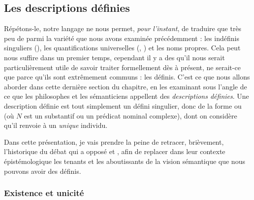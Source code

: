 \medskip











\subsection{Les descriptions définies}  %
\label{s:GNdef}


Répétons-le, notre langage {\LO} ne nous permet, \emph{pour l'instant}, de traduire que très peu de {\GN} parmi la variété que nous avons examinée précédemment : les indéfinis singuliers (), les quantifications universelles (, ) et les noms propres. 
Cela peut nous suffire dans un premier temps, cependant il y a des {\GN} qu'il nous serait particulièrement utile de savoir traiter formellement dès à présent, ne serait-ce que parce qu'ils sont extrêmement communs : les {\GN} définis. 
C'est ce que nous allons aborder dans cette dernière section du chapitre, en les examinant sous l'angle de ce que les philosophes et les sémanticiens appellent des \emph{descriptions définies}. 
Une description définie est tout simplement un {\GN} défini singulier, donc de la forme  ou  (où $N$ est un substantif ou un prédicat nominal complexe), dont on considère qu'il renvoie à un \emph{unique} individu.

Dans cette présentation, je vais prendre la peine de retracer, brièvement, l'historique du débat qui a opposé \citet{Rus:05fr} et \citet{Strawson:50fr}, afin de  replacer dans leur  contexte épistémologique les tenants et les aboutissants de la vision sémantique que nous pouvons avoir des {\GN} définis.

\subsubsection{Existence et unicité} 
\label{sss:Russell}

